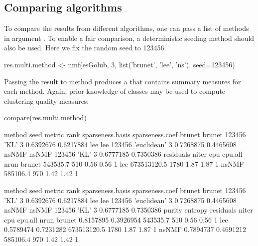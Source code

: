 \documentclass[a4paper]{article}
\begin{document}
\subsection{Comparing algorithms}
To compare the results from different algorithms, one can pass a list of methods 
in argument . To enable a fair comparison, a deterministic seeding 
method should also be used. Here we fix the random seed to 123456. 

\begin{Schunk}
\begin{Sinput}
 res.multi.method <- nmf(esGolub, 3, list('brunet', 'lee', 'ns'), seed=123456)
\end{Sinput}
\end{Schunk}

Passing the result to method  produces a  
that contains summary measures for each method. Again, prior knowledge of classes 
may be used to compute clustering quality measures:  

\begin{Schunk}
\begin{Sinput}
 compare(res.multi.method)
\end{Sinput}
\begin{Soutput}
       method   seed      metric rank sparseness.basis sparseness.coef
brunet brunet 123456        'KL'    3        0.6392676       0.6217884
lee       lee 123456 'euclidean'    3        0.7268875       0.4465608
nsNMF   nsNMF 123456        'KL'    3        0.6777185       0.7350386
         residuals niter  cpu cpu.all nrun
brunet    543535.7   510 0.56    0.56    1
lee    673513120.5  1780 1.87    1.87    1
nsNMF     585106.4   970 1.42    1.42    1
\end{Soutput}
\begin{Soutput}
       method   seed      metric rank sparseness.basis sparseness.coef
brunet brunet 123456        'KL'    3        0.6392676       0.6217884
lee       lee 123456 'euclidean'    3        0.7268875       0.4465608
nsNMF   nsNMF 123456        'KL'    3        0.6777185       0.7350386
          purity   entropy   residuals niter  cpu cpu.all nrun
brunet 0.8157895 0.3926954    543535.7   510 0.56    0.56    1
lee    0.5789474 0.7231282 673513120.5  1780 1.87    1.87    1
nsNMF  0.7894737 0.4691212    585106.4   970 1.42    1.42    1
\end{Soutput}
\end{Schunk}
\end{document}
